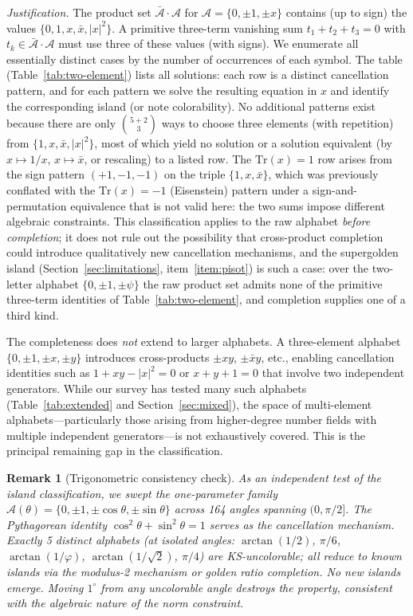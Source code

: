 \documentclass[12pt,a4paper]{article}
\newtheorem{remark}[theorem]{Remark}
\begin{document}
\emph{Justification.} The product set $\bar{\mathcal{A}} \cdot \mathcal{A}$ for $\mathcal{A} = \{0, \pm 1, \pm x\}$ contains (up to sign) the values $\{0, 1, x, \bar{x}, |x|^2\}$.  A primitive three-term vanishing sum $t_1 + t_2 + t_3 = 0$ with $t_k \in \bar{\mathcal{A}} \cdot \mathcal{A}$ must use three of these values (with signs).  We enumerate all essentially distinct cases by the number of occurrences of each symbol.  The table (Table~\ref{tab:two-element}) lists all solutions: each row is a distinct cancellation pattern, and for each pattern we solve the resulting equation in $x$ and identify the corresponding island (or note colorability).  No additional patterns exist because there are only $\binom{5+2}{3}$ ways to choose three elements (with repetition) from $\{1, x, \bar{x}, |x|^2\}$, most of which yield no solution or a solution equivalent (by $x \mapsto 1/x$, $x \mapsto \bar{x}$, or rescaling) to a listed row.  The $\mathrm{Tr}(x) = 1$ row arises from the sign pattern $(+1, -1, -1)$ on the triple $\{1, x, \bar{x}\}$, which was previously conflated with the $\mathrm{Tr}(x) = -1$ (Eisenstein) pattern under a sign-and-permutation equivalence that is not valid here: the two sums impose different algebraic constraints.  This classification applies to the raw alphabet \emph{before completion}; it does not rule out the possibility that cross-product completion could introduce qualitatively new cancellation mechanisms, and the supergolden island (Section~\ref{sec:limitations}, item~\ref{item:pisot}) is such a case: over the two-letter alphabet $\{0, \pm 1, \pm\psi\}$ the raw product set admits none of the primitive three-term identities of Table~\ref{tab:two-element}, and completion supplies one of a third kind.

The completeness does \emph{not} extend to larger alphabets.  A three-element alphabet $\{0, \pm 1, \pm x, \pm y\}$ introduces cross-products $\pm xy$, $\pm \bar{x}y$, etc., enabling cancellation identities such as $1 + xy - |x|^2 = 0$ or $x + y + 1 = 0$ that involve two independent generators.  While our survey has tested many such alphabets (Table~\ref{tab:extended} and Section~\ref{sec:mixed}), the space of multi-element alphabets---particularly those arising from higher-degree number fields with multiple independent generators---is not exhaustively covered.  This is the principal remaining gap in the classification.

\begin{remark}[Trigonometric consistency check]\label{rem:trig}
As an independent test of the island classification, we swept the one-parameter family $\mathcal{A}(\theta) = \{0, \pm 1, \pm\cos\theta, \pm\sin\theta\}$ across 164 angles spanning $(0, \pi/2]$. The Pythagorean identity $\cos^2\theta + \sin^2\theta = 1$ serves as the cancellation mechanism. Exactly 5 distinct alphabets (at isolated angles: $\arctan(1/2)$, $\pi/6$, $\arctan(1/\varphi)$, $\arctan(1/\sqrt{2})$, $\pi/4$) are KS-uncolorable; all reduce to known islands via the modulus-2 mechanism or golden ratio completion. No new islands emerge. Moving $1^\circ$ from any uncolorable angle destroys the property, consistent with the algebraic nature of the norm constraint.
\end{remark}
\end{document}
